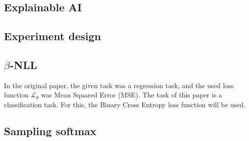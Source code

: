\subsection{Explainable AI}

\subsection{Experiment design}




\subsection{$\beta$-NLL}

In the original paper, the given task was a regression task, and the used loss function $\mathcal{L_{\theta}}$ was Mean Squared Error (MSE). The task of this paper is a classification task. For this, the Binary Cross Entropy loss function will be used.

\subsection{Sampling softmax}